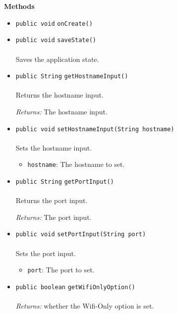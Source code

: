 \textbf{\sffamily Methods}
\begin{itemize}
\item \lstinline|public void| \lstinline|onCreate|\lstinline|()| \\[-0.6em]




\item \lstinline|public void| \lstinline|saveState|\lstinline|()|\\ \\[-0.6em]
Saves the application state.



\item \lstinline|public String| \lstinline|getHostnameInput|\lstinline|()|\\ \\[-0.6em]
Returns the hostname input.

\emph{Returns:} The hostname input.

\item \lstinline|public void| \lstinline|setHostnameInput|\lstinline|(String hostname)|\\ \\[-0.6em]
Sets the hostname input.
\begin{itemize}
\item \lstinline|hostname|: The hostname to set.
\end{itemize}



\item \lstinline|public String| \lstinline|getPortInput|\lstinline|()|\\ \\[-0.6em]
Returns the port input.

\emph{Returns:} The port input.

\item \lstinline|public void| \lstinline|setPortInput|\lstinline|(String port)|\\ \\[-0.6em]
Sets the port input.
\begin{itemize}
\item \lstinline|port|: The port to set.
\end{itemize}



\item \lstinline|public boolean| \lstinline|getWifiOnlyOption|\lstinline|()|\\ \\[-0.6em]
\emph{Returns:} whether the Wifi-Only option is set.




\end{itemize}
